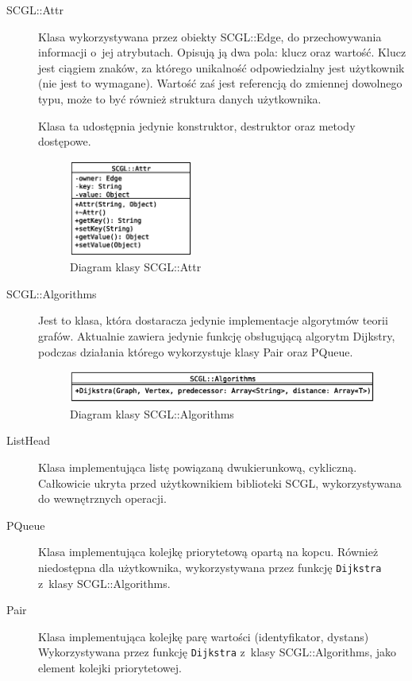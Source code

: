 \documentclass[a4paper,12pt,polish,oneside,openright]{thesis}
\newcommand\code[1]{\lstinline[style=line]{#1}}
\begin{document}
\begin{description}
	\item[SCGL::Attr]
	Klasa wykorzystywana przez obiekty SCGL::Edge, do przechowywania informacji o~jej atrybutach.
	Opisują ją dwa pola: klucz oraz wartość.
	Klucz jest ciągiem znaków, za którego unikalność odpowiedzialny jest użytkownik (nie jest to wymagane).
	Wartość zaś jest referencją do zmiennej dowolnego typu, może to być również struktura danych użytkownika.
	
	Klasa ta udostępnia jedynie konstruktor, destruktor oraz metody dostępowe.
	\begin{figure}[htb]
	\begin{center}
		\includegraphics[width=0.4\textwidth]{class_attr.eps}
		\caption{Diagram klasy SCGL::Attr}
	\end{center}
	\end{figure}

	\item[SCGL::Algorithms]
	Jest to klasa, która dostaracza jedynie implementacje algorytmów teorii grafów.
	Aktualnie zawiera jedynie funkcję obsługującą algorytm Dijkstry, podczas działania którego wykorzystuje klasy Pair oraz PQueue.
	\begin{figure}[htb]
	\begin{center}
		\includegraphics[width=1.0\textwidth]{class_algo.eps}
		\caption{Diagram klasy SCGL::Algorithms}
	\end{center}
	\end{figure}

	\item[ListHead]
	Klasa implementująca listę powiązaną dwukierunkową, cykliczną.
	Całkowicie ukryta przed użytkownikiem biblioteki SCGL, wykorzystywana do wewnętrznych operacji.

	\item[PQueue]
	Klasa implementująca kolejkę priorytetową opartą na kopcu.
	Również niedostępna dla użytkownika, wykorzystywana przez funkcję \code{Dijkstra} z~klasy SCGL::Algorithms.

	\item[Pair]
	Klasa implementująca kolejkę parę wartości (identyfikator, dystans)
	Wykorzystywana przez funkcję \code{Dijkstra} z~klasy SCGL::Algorithms, jako element kolejki priorytetowej.
\end{description}
\end{document}
